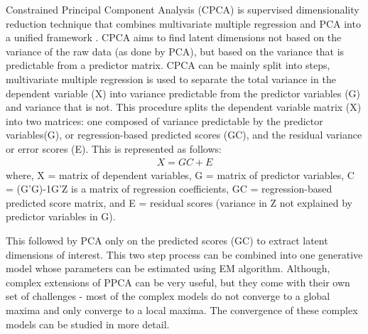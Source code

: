 Constrained Principal Component Analysis (CPCA) is supervised dimensionality reduction technique that combines multivariate multiple regression and PCA into a unified framework \cite{takane2001constrained}. CPCA aims to find latent dimensions not based on the variance of the raw data (as done by PCA), but based on the variance that is predictable from a predictor matrix. CPCA can be mainly split into steps, multivariate multiple regression is used to separate the total variance in the dependent variable (X) into variance predictable from the predictor variables (G) and variance that is not. This procedure splits the dependent variable matrix (X) into two matrices: one composed of variance predictable by the predictor variables(G), or regression-based predicted scores (GC), and the residual variance or error scores (E). This is represented as follows: 
\begin{align*}
	X = GC + E
\end{align*} 
where, X = matrix of dependent variables, G = matrix of predictor variables, C = (G’G)-1G’Z is a matrix of regression coefficients, GC = regression-based predicted score matrix, and E = residual scores (variance in Z not explained by predictor variables in G).

This followed by PCA only on the predicted scores (GC) to extract latent dimensions of interest. This two step process can be combined into one generative model whose parameters can be estimated using EM algorithm. Although, complex extensions of PPCA can be very useful, but they come with their own set of challenges - most of the complex models do not converge to a global maxima and only converge to a local maxima. The convergence of these complex models can be studied in more detail. 